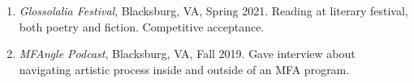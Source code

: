 \begin{enumerate}
    
      \item  \emph{Glossolalia Festival}, Blacksburg, VA, Spring 2021. \subitem Reading at literary festival, both poetry and fiction. Competitive acceptance. \\
  \item  \emph{MFAngle Podcast}, Blacksburg, VA, Fall 2019. \subitem Gave interview about navigating artistic process inside and outside of an MFA program.
 
 \end{enumerate}
